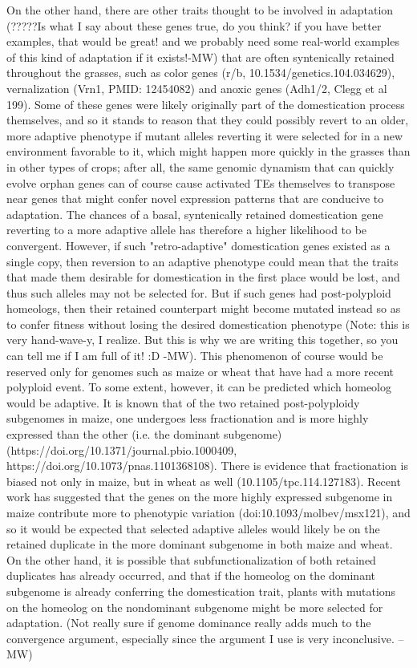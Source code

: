 \documentclass[12pt]{article}
\begin{document}
On the other hand, there are other traits thought to be involved in adaptation (?????Is what I say about these genes true, do you think? if you have better examples, that would be great! and we probably need some real-world examples of this kind of adaptation if it exists!-MW) that are often syntenically retained throughout the grasses, such as color genes (r/b, 10.1534/genetics.104.034629), vernalization (Vrn1, PMID: 12454082) and anoxic genes (Adh1/2, Clegg et al 199).  Some of these genes were likely originally part of the domestication process themselves, and so it stands to reason that they could possibly revert to an older, more adaptive phenotype if mutant alleles reverting it were selected for in a new environment favorable to it, which might happen more quickly in the grasses than in other types of crops; after all, the same genomic dynamism that can quickly evolve orphan genes can of course cause activated TEs themselves to transpose near genes that might confer novel expression patterns that are conducive to adaptation. The chances of a basal, syntenically retained domestication gene reverting to a more adaptive allele has therefore a higher likelihood to be convergent. However, if such "retro-adaptive" domestication genes existed as a single copy, then reversion to an adaptive phenotype could mean that the traits that made them desirable for domestication in the first place would be lost, and thus such alleles may not be selected for. But if such genes had post-polyploid homeologs, then their retained counterpart might become mutated instead so as to confer fitness without losing the desired domestication phenotype (Note: this is very hand-wave-y, I realize. But this is why we are writing this together, so you can tell me if I am full of it! :D -MW). This phenomenon of course would be reserved only for genomes such as maize or wheat that have had a more recent polyploid event. To some extent, however, it can be predicted which homeolog would be adaptive. It is known that of the two retained post-polyploidy subgenomes in maize, one undergoes less fractionation and is more highly expressed than the other (i.e. the dominant subgenome) (https://doi.org/10.1371/journal.pbio.1000409, https://doi.org/10.1073/pnas.1101368108). There is evidence that fractionation is biased not only in maize, but in wheat as well (10.1105/tpc.114.127183). Recent work has suggested that the genes on the more highly expressed subgenome in maize contribute more to phenotypic variation (doi:10.1093/molbev/msx121), and so it would be expected that selected adaptive alleles would likely be on the retained duplicate in the more dominant subgenome in both maize and wheat.  On the other hand, it is possible that subfunctionalization of both retained duplicates has already occurred, and that if the homeolog on the dominant subgenome is already conferring the domestication trait, plants with mutations on the homeolog on the nondominant subgenome might be more selected for adaptation. (Not really sure if genome dominance really adds much to the convergence argument, especially since the argument I use is very inconclusive. --MW)
\end{document}
